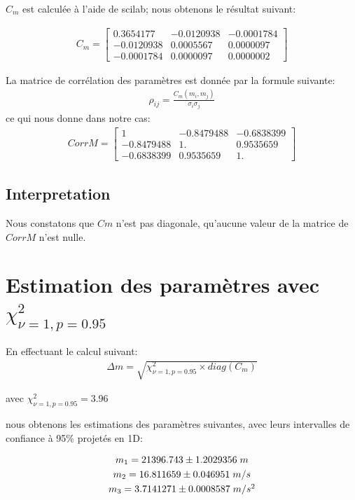 \documentclass[12pt,a4paper]{extreport}
\begin{document}
$C_m$ est calculée à l'aide de scilab; nous obtenons le résultat suivant:

\begin{gather}
	C_m =
	\begin{bmatrix}
		0.3654177 & -0.0120938 & -0.0001784 \\
  		-0.0120938 &  0.0005567 &  0.0000097 \\
  		-0.0001784 &  0.0000097  & 0.0000002
	\end{bmatrix}
\end{gather}

La matrice de corrélation des paramètres est donnée par la formule suivante:
\begin{gather}
	\rho_{ij} = \frac{C_m(m_i,m_j)}{\sigma_i\sigma_j}
\end{gather}
ce qui nous donne dans notre cas:
\begin{gather}
	CorrM =
	\begin{bmatrix}
	1 &-0.8479488 & -0.6838399 \\
  -0.8479488  & 1.        &  0.9535659 \\
  -0.6838399 &  0.9535659  & 1.  
	\end{bmatrix}
\end{gather}

\subsection*{Interpretation}
Nous constatons que $Cm$ n'est pas diagonale, qu'aucune valeur de la matrice de $CorrM$ n'est nulle.

\section{Estimation des paramètres avec $\chi_{\nu=1,p=0.95}^2$}
En effectuant le calcul suivant:
\begin{gather}
	\Delta m = \sqrt{\chi_{\nu=1,p=0.95}^2 \times diag(C_m)}
\end{gather}

avec $\chi_{\nu=1,p=0.95}^2 = 3.96$


nous obtenons les estimations des paramètres suivantes, avec leurs intervalles de confiance à 95\% projetés en 1D:

\begin{equation}
	\begin{array}{c}
		m_1 = 21396.743 \pm 1.2029356\;m\\
		[\jot] m_2 = 16.811659 \pm 0.046951\;m/s\\
		[\jot] m_3 = 3.7141271 \pm 0.0008587\;m/s^2
	\end{array}
\end{equation}
\end{document}
